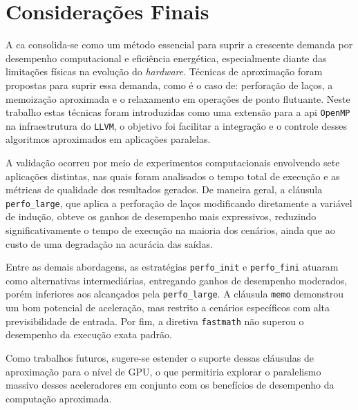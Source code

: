 \chapter{Considerações Finais}\label{cap:conclusao}

A \gls{ca} consolida-se como um método essencial para suprir a crescente demanda por desempenho computacional e eficiência energética, especialmente diante das limitações físicas na evolução do \textit{hardware}. Técnicas de aproximação foram propostas para suprir essa demanda, como é o caso de: perforação de laços, a memoização aproximada e o relaxamento em operações de ponto flutuante. Neste trabalho estas técnicas foram introduzidas como uma extensão para a \gls{api} \texttt{OpenMP} na infraestrutura do \texttt{LLVM}, o objetivo foi facilitar a integração e o controle desses algoritmos aproximados em aplicações paralelas.

A validação ocorreu por meio de experimentos computacionais envolvendo sete aplicações distintas, nas quais foram analisados o tempo total de execução e as métricas de qualidade dos resultados gerados. De maneira geral, a cláusula \texttt{perfo\_large}, que aplica a perforação de laços modificando diretamente a variável de indução, obteve os ganhos de desempenho mais expressivos, reduzindo significativamente o tempo de execução na maioria dos cenários, ainda que ao custo de uma degradação na acurácia das saídas.

Entre as demais abordagens, as estratégias \texttt{perfo\_init} e \texttt{perfo\_fini} atuaram como alternativas intermediárias, entregando ganhos de desempenho moderados, porém inferiores aos alcançados pela \texttt{perfo\_large}. A cláusula \texttt{memo} demonstrou um bom potencial de aceleração, mas restrito a cenários específicos com alta previsibilidade de entrada. Por fim, a diretiva \texttt{fastmath} não superou o desempenho da execução exata padrão.

Como trabalhos futuros, sugere-se estender o suporte dessas cláusulas de aproximação para o nível de GPU, o que permitiria explorar o paralelismo massivo desses aceleradores em conjunto com os benefícios de desempenho da computação aproximada.